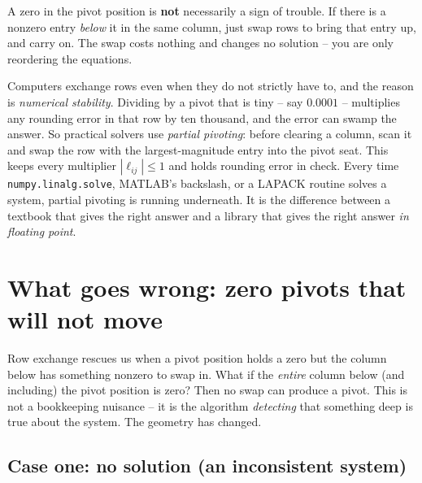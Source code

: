 \begin{focusbox}
A zero in the pivot position is \textbf{not} necessarily a sign of trouble. If
there is a nonzero entry \emph{below} it in the same column, just swap rows to
bring that entry up, and carry on. The swap costs nothing and changes no
solution -- you are only reordering the equations.
\end{focusbox}

\begin{applicationbox}
Computers exchange rows even when they do not strictly have to, and the reason is
\emph{numerical stability}. Dividing by a pivot that is tiny -- say
$0.0001$ -- multiplies any rounding error in that row by ten thousand, and the
error can swamp the answer. So practical solvers use \emph{partial pivoting}:
before clearing a column, scan it and swap the row with the largest-magnitude
entry into the pivot seat. This keeps every multiplier $|\ell_{ij}| \le 1$ and
holds rounding error in check. Every time \texttt{numpy.linalg.solve},
MATLAB's backslash, or a LAPACK routine solves a system, partial pivoting is
running underneath. It is the difference between a textbook that gives the right
answer and a library that gives the right answer \emph{in floating point}.
\end{applicationbox}

\section{What goes wrong: zero pivots that will not move}

Row exchange rescues us when a pivot position holds a zero but the column below
has something nonzero to swap in. What if the \emph{entire} column below (and
including) the pivot position is zero? Then no swap can produce a pivot. This is
not a bookkeeping nuisance -- it is the algorithm \emph{detecting} that something
deep is true about the system. The geometry has changed.

\subsection{Case one: no solution (an inconsistent system)}

